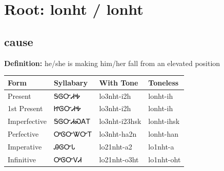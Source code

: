 \documentclass{article}%
\begin{document}
%
\normalsize%
\section*{Root: lonht / lonht}%
\subsection*{cause}%
\textbf{Definition: }%
he/she is making him/her fall from an elevated position%
\\[0.5em]%
\begin{tabular}{|l|l|l|l|}%
\hline%
\textbf{Form}&\textbf{Syllabary}&\textbf{With Tone}&\textbf{Toneless}\\%
\hline%
Present&ᎦᎶᏅᏗᎭ&lo3nht{-}i2h&lonht{-}ih\\%
1st Present&ᏥᎶᏅᏗᎭ&lo3nht{-}i2h&lonht{-}ih\\%
Imperfective&ᎦᎶᏅᏗᏍᎪᎢ&lo3nht{-}i23hsk&lonht{-}ihsk\\%
Perfective&ᎤᎶᏅᏔᏅᎢ&lo3nht{-}ha2n&lonht{-}han\\%
Imperative&ᎯᎶᏅᏓ&lo21nht{-}a2&lo1nht{-}a\\%
Infinitive&ᎤᎶᏅᏙᏗ&lo21nht{-}o3ht&lo1nht{-}oht\\%
\hline%
\end{tabular}%
\\[1em]%
\end{document}
